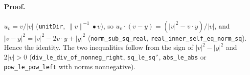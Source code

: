 \paragraph{Proof.} $u_v=v/|v|$ (\texttt{unitDir}, $\|v\|^{-1}\bullet v$), so $u_v\cdot(v-y)=(|v|^2-v\cdot y)/|v|$, and
$|v-y|^2=|v|^2-2v\cdot y+|y|^2$ (\texttt{norm\_sub\_sq\_real}, \texttt{real\_inner\_self\_eq\_norm\_sq}). Hence the identity.
The two inequalities follow from the sign of $|v|^2-|y|^2$ and $2|v|>0$ (\texttt{div\_le\_div\_of\_nonneg\_right},
\texttt{sq\_le\_sq'}, \texttt{abs\_le\_abs} or \texttt{pow\_le\_pow\_left} with norms nonnegative).
